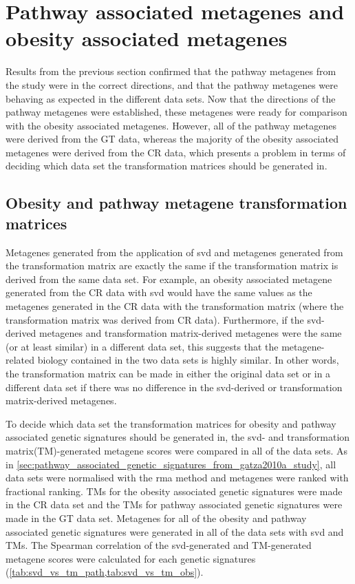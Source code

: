 \section{Pathway associated metagenes and obesity associated metagenes}
\label{sec:pathway_associated_metagenes_and_obesity_associated_metagenes}

Results from the previous section confirmed that the pathway metagenes from the \citet{Gatza2010a} study were in the correct directions, and that the pathway metagenes were behaving as expected in the different data sets.
Now that the directions of the pathway metagenes were established, these metagenes were ready for comparison with the obesity associated metagenes.
However, all of the pathway metagenes were derived from the GT data, whereas the majority of the obesity associated metagenes were derived from the CR data, which presents a problem in terms of deciding which data set the transformation matrices should be generated in.

\subsection{Obesity and pathway metagene transformation matrices}
\label{sub:obesity_and_pathway_metagene_transformation_matrices}

Metagenes generated from the application of \gls{svd} and metagenes generated from the transformation matrix are exactly the same if the transformation matrix is derived from the same data set.
For example, an obesity associated metagene generated from the CR data with \gls{svd} would have the same values as the metagenes generated in the CR data with the transformation matrix (where the transformation matrix was derived from CR data).
Furthermore, if the \gls{svd}-derived metagenes and transformation matrix-derived metagenes were the same (or at least similar) in a different data set, this suggests that the metagene-related biology contained in the two data sets is highly similar.
In other words, the transformation matrix can be made in either the original data set or in a different data set if there was no difference in the \gls{svd}-derived or transformation matrix-derived metagenes.

To decide which data set the transformation matrices for obesity and pathway associated genetic signatures should be generated in, the \gls{svd}- and transformation matrix(TM)-generated metagene scores were compared in all of the data sets.
As in \cref{sec:pathway_associated_genetic_signatures_from_gatza2010a_study}, all data sets were normalised with the \gls{rma} method and metagenes were ranked with fractional ranking.
TMs for the obesity associated genetic signatures were made in the CR data set and the TMs for pathway associated genetic signatures were made in the GT data set.
Metagenes for all of the obesity and pathway associated genetic signatures were generated in all of the data sets with \gls{svd} and TMs.
The Spearman correlation of the \gls{svd}-generated and TM-generated metagene scores were calculated for each genetic signatures (\cref{tab:svd_vs_tm_path,tab:svd_vs_tm_obs}).

